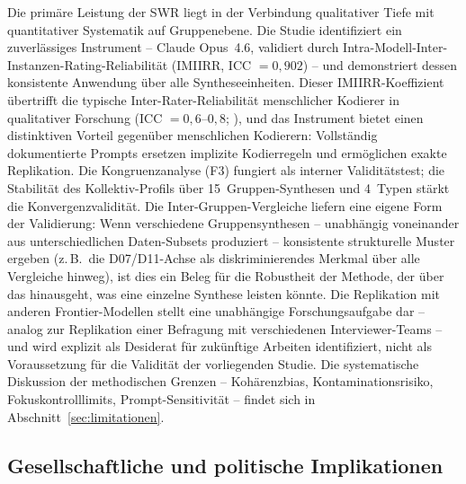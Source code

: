\documentclass[12pt,a4paper]{article}
\begin{document}
Die prim\"are Leistung der SWR liegt in der Verbindung qualitativer Tiefe mit quantitativer Systematik auf Gruppenebene. Die Studie identifiziert ein zuverl\"assiges Instrument -- Claude Opus~4.6, validiert durch Intra-Modell-Inter-Instanzen-Rating-Reliabilit\"at (IMIIRR, ICC $= 0{,}902$) -- und demonstriert dessen konsistente Anwendung \"uber alle Syntheseeinheiten. Dieser IMIIRR-Koeffizient \"ubertrifft die typische Inter-Rater-Reliabilit\"at menschlicher Kodierer in qualitativer Forschung (ICC $= 0{,}6$--$0{,}8$; \citealt{Hallgren2012}), und das Instrument bietet einen distinktiven Vorteil gegen\"uber menschlichen Kodierern: Vollst\"andig dokumentierte Prompts ersetzen implizite Kodierregeln und erm\"oglichen exakte Replikation. Die Kongruenzanalyse (F3) fungiert als interner Validit\"atstest; die Stabilit\"at des Kollektiv-Profils \"uber 15~Gruppen-Synthesen und 4~Typen st\"arkt die Konvergenzvalidit\"at. Die Inter-Gruppen-Vergleiche liefern eine eigene Form der Validierung: Wenn verschiedene Gruppensynthesen -- unabh\"angig voneinander aus unterschiedlichen Daten-Subsets produziert -- konsistente strukturelle Muster ergeben (z.\,B.\ die D07/D11-Achse als diskriminierendes Merkmal \"uber alle Vergleiche hinweg), ist dies ein Beleg f\"ur die Robustheit der Methode, der \"uber das hinausgeht, was eine einzelne Synthese leisten k\"onnte. Die Replikation mit anderen Frontier-Modellen stellt eine unabh\"angige Forschungsaufgabe dar -- analog zur Replikation einer Befragung mit verschiedenen Interviewer-Teams -- und wird explizit als Desiderat f\"ur zuk\"unftige Arbeiten identifiziert, nicht als Voraussetzung f\"ur die Validit\"at der vorliegenden Studie. Die systematische Diskussion der methodischen Grenzen -- Koh\"arenzbias, Kontaminationsrisiko, Fokuskontrolllimits, Prompt-Sensitivit\"at -- findet sich in Abschnitt~\ref{sec:limitationen}.


\subsection{Gesellschaftliche und politische Implikationen}
\label{sec:diskussion:implikationen}
\end{document}
